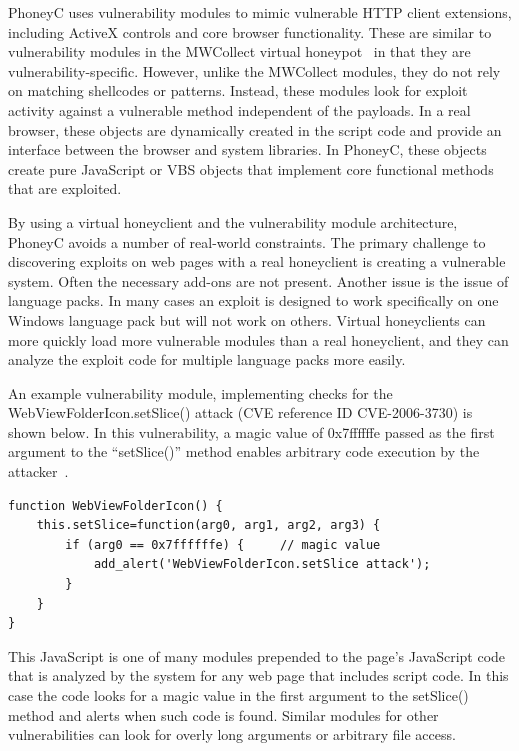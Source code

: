 \documentclass[10pt,twocolumn]{article}
\begin{document}
PhoneyC uses vulnerability modules to mimic vulnerable HTTP client extensions, including ActiveX controls and core browser functionality. These are similar to vulnerability modules in the MWCollect virtual honeypot~\cite{freiling2005bte} in that they are vulnerability-specific. However, unlike the MWCollect modules, they do not rely on matching shellcodes or patterns. Instead, these modules look for  exploit activity against a vulnerable method independent of the payloads. In a real browser, these objects are dynamically created in the script code and provide an interface between the browser and system libraries. In PhoneyC, these objects create pure JavaScript or VBS objects that implement core functional methods that are exploited. 

By using a virtual honeyclient and the vulnerability module architecture, PhoneyC avoids a number of real-world constraints. The primary challenge to discovering exploits on web pages with a real honeyclient is creating a vulnerable system. Often the necessary add-ons are not present. Another issue is the issue of language packs. In many cases an exploit is designed to work specifically on one Windows language pack but will not work on others. Virtual honeyclients can more quickly load more vulnerable modules than a real honeyclient, and they can analyze the exploit code for multiple language packs more easily.

An example vulnerability module, implementing checks for the WebViewFolderIcon.setSlice() attack (CVE reference ID CVE-2006-3730) is shown below. In this vulnerability, a magic value of 0x7ffffffe passed as the first argument to the ``setSlice()'' method enables arbitrary code execution by the attacker~\cite{setslice}. 
\scriptsize
\begin{verbatim}
function WebViewFolderIcon() {
    this.setSlice=function(arg0, arg1, arg2, arg3) {
        if (arg0 == 0x7ffffffe) {     // magic value
            add_alert('WebViewFolderIcon.setSlice attack');
        }
    }
}
\end{verbatim}
\normalsize
This JavaScript is one of many modules prepended to the page's JavaScript code that is analyzed by the system for any web page that includes script code. In this case the code looks for a magic value in the first argument to the setSlice() method and alerts when such code is found. Similar modules for other vulnerabilities can look for overly long arguments or arbitrary file access.
\end{document}
